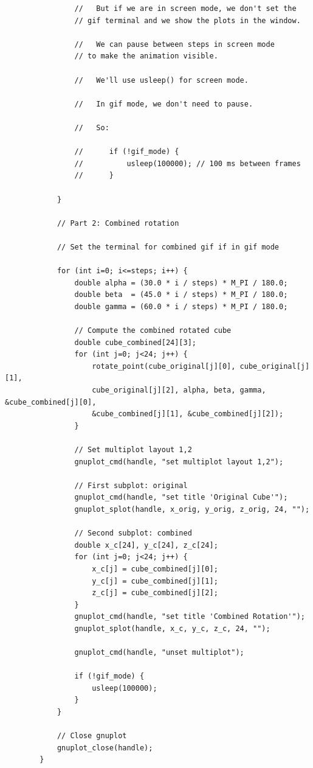 \documentclass[a4paper,10pt]{article}
\begin{document}
\begin{verbatim}
                //   But if we are in screen mode, we don't set the
                // gif terminal and we show the plots in the window.

                //   We can pause between steps in screen mode
                // to make the animation visible.

                //   We'll use usleep() for screen mode.

                //   In gif mode, we don't need to pause.

                //   So:

                //      if (!gif_mode) {
                //          usleep(100000); // 100 ms between frames
                //      }

            }

            // Part 2: Combined rotation

            // Set the terminal for combined gif if in gif mode

            for (int i=0; i<=steps; i++) {
                double alpha = (30.0 * i / steps) * M_PI / 180.0;
                double beta  = (45.0 * i / steps) * M_PI / 180.0;
                double gamma = (60.0 * i / steps) * M_PI / 180.0;

                // Compute the combined rotated cube
                double cube_combined[24][3];
                for (int j=0; j<24; j++) {
                    rotate_point(cube_original[j][0], cube_original[j][1],
                    cube_original[j][2], alpha, beta, gamma, &cube_combined[j][0],
                    &cube_combined[j][1], &cube_combined[j][2]);
                }

                // Set multiplot layout 1,2
                gnuplot_cmd(handle, "set multiplot layout 1,2");

                // First subplot: original
                gnuplot_cmd(handle, "set title 'Original Cube'");
                gnuplot_splot(handle, x_orig, y_orig, z_orig, 24, "");

                // Second subplot: combined
                double x_c[24], y_c[24], z_c[24];
                for (int j=0; j<24; j++) {
                    x_c[j] = cube_combined[j][0];
                    y_c[j] = cube_combined[j][1];
                    z_c[j] = cube_combined[j][2];
                }
                gnuplot_cmd(handle, "set title 'Combined Rotation'");
                gnuplot_splot(handle, x_c, y_c, z_c, 24, "");

                gnuplot_cmd(handle, "unset multiplot");

                if (!gif_mode) {
                    usleep(100000);
                }
            }

            // Close gnuplot
            gnuplot_close(handle);
        }
\end{verbatim}
\end{document}
